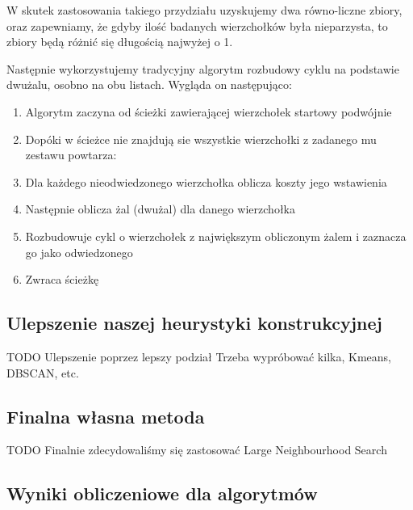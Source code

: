 \documentclass[11pt]{article}
\begin{document}
W skutek zastosowania takiego przydziału uzyskujemy dwa równo-liczne zbiory, oraz zapewniamy, że gdyby ilość badanych wierzchołków była nieparzysta, to zbiory będą różnić się długością najwyżej o 1.

Następnie wykorzystujemy tradycyjny algorytm rozbudowy cyklu na podstawie dwużalu, osobno na obu listach.
Wygląda on następująco:

\begin{enumerate}
    \item Algorytm zaczyna od ścieżki zawierającej wierzchołek startowy podwójnie
    \item Dopóki w ścieżce nie znajdują sie wszystkie wierzchołki z zadanego mu zestawu powtarza:
    \item Dla każdego nieodwiedzonego wierzchołka oblicza koszty jego wstawienia
    \item Następnie oblicza żal (dwużal) dla danego wierzchołka
    \item Rozbudowuje cykl o wierzchołek z największym obliczonym żalem i zaznacza go jako odwiedzonego
    \item Zwraca ścieżkę
\end{enumerate}

\subsection{Ulepszenie naszej heurystyki konstrukcyjnej}\label{subsec:ulepszenie-naszej-heurystyki-konstrukcyjnej}

TODO
Ulepszenie poprzez lepszy podział
Trzeba wypróbować kilka, Kmeans, DBSCAN, etc.

\subsection{Finalna własna metoda}\label{subsec:finalna-wasna-metoda}

TODO
Finalnie zdecydowaliśmy się zastosować Large Neighbourhood Search


\subsection{Wyniki obliczeniowe dla algorytmów}\label{subsec:wyniki-obliczeniowe-dla-algorytmow}
\end{document}
